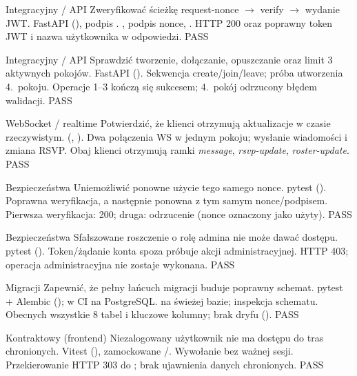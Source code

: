 {Integracyjny / API}
{Zweryfikować ścieżkę request-nonce $\rightarrow$ verify $\rightarrow$ wydanie JWT.}
{FastAPI  (), podpis .}
{, podpis nonce, .}
{HTTP 200 oraz poprawny token JWT i nazwa użytkownika w odpowiedzi.}
{PASS}

{Integracyjny / API}
{Sprawdzić tworzenie, dołączanie, opuszczanie oraz limit 3 aktywnych pokojów.}
{FastAPI  ().}
{Sekwencja create/join/leave; próba utworzenia 4.\ pokoju.}
{Operacje 1--3 kończą się sukcesem; 4.\ pokój odrzucony błędem walidacji.}
{PASS}

{WebSocket / realtime}
{Potwierdzić, że klienci otrzymują aktualizacje w czasie rzeczywistym.}
{ (, ).}
{Dwa połączenia WS w jednym pokoju; wysłanie wiadomości i zmiana RSVP.}
{Obaj klienci otrzymują ramki \emph{message}, \emph{rsvp-update}, \emph{roster-update}.}
{PASS}

{Bezpieczeństwa}
{Uniemożliwić ponowne użycie tego samego nonce.}
{pytest ().}
{Poprawna weryfikacja, a następnie ponowna z tym samym nonce/podpisem.}
{Pierwsza weryfikacja: 200; druga: odrzucenie (nonce oznaczony jako użyty).}
{PASS}

{Bezpieczeństwa}
{Sfałszowane roszczenie o rolę admina nie może dawać dostępu.}
{pytest ().}
{Token/żądanie konta spoza  próbuje akcji administracyjnej.}
{HTTP 403; operacja administracyjna nie zostaje wykonana.}
{PASS}

{Migracji}
{Zapewnić, że pełny łańcuch migracji buduje poprawny schemat.}
{pytest + Alembic (); w CI na PostgreSQL.}
{ na świeżej bazie; inspekcja schematu.}
{Obecnych wszystkie 8 tabel i kluczowe kolumny; brak dryfu ().}
{PASS}

{Kontraktowy (frontend)}
{Niezalogowany użytkownik nie ma dostępu do tras chronionych.}
{Vitest (), zamockowane /.}
{Wywołanie  bez ważnej sesji.}
{Przekierowanie HTTP 303 do ; brak ujawnienia danych chronionych.}
{PASS}

